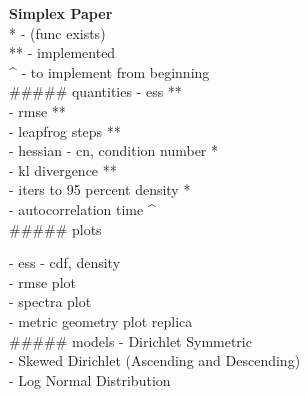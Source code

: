 \noindent \textbf{\Huge Simplex Paper}\\[0.3cm]


* - (func exists)\\
** - implemented\\
^ - to implement from beginning\\
##### quantities
- ess **\\
- rmse **\\
- leapfrog steps **\\
- hessian - cn, condition number *\\
- kl divergence **\\
- iters to 95 percent density *\\
- autocorrelation time ^\\

##### plots

- ess - cdf, density\\
- rmse plot\\
- spectra plot\\
- metric geometry plot replica\\

##### models
- Dirichlet Symmetric\\
- Skewed Dirichlet (Ascending and Descending)\\
- Log Normal Distribution\\
